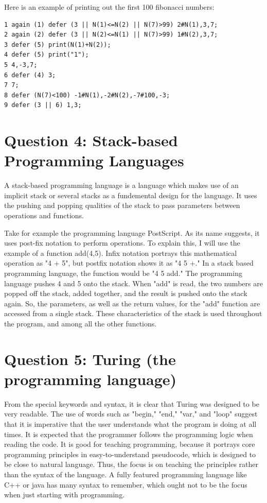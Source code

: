 \documentclass[a4paper]{article}
\begin{document}
	Here is an example of printing out the first 100 fibonacci numbers:
	\begin{lstlisting}
1 again (1) defer (3 || N(1)<=N(2) || N(7)>99) 2#N(1),3,7;
2 again (2) defer (3 || N(2)<=N(1) || N(7)>99) 1#N(2),3,7;
3 defer (5) print(N(1)+N(2));
4 defer (5) print("1");
5 4,-3,7;
6 defer (4) 3;
7 7;
8 defer (N(7)<100) -1#N(1),-2#N(2),-7#100,-3;
9 defer (3 || 6) 1,3; 
	\end{lstlisting}
\section{Question 4: Stack-based Programming Languages}
	A stack-based programming language is a language which makes use of an implicit stack or several stacks as a fundemental design for the language. It uses the pushing and popping qualities of the stack to pass parameters between operations and functions. 
	
	Take for example the programming language PostScript. As its name suggests, it uses post-fix notation to perform operations. To explain this, I will use the example of a function add(4,5). Infix notation portrays this mathematical operation as "4 + 5", but postfix notation shows it as "4 5 +." In a stack based programming language, the function would be "4 5 add." The programming language pushes 4 and 5 onto the stack. When "add" is read, the two numbers are popped off the stack, added together, and the result is pushed onto the stack again. So, the parameters, as well as the return values, for the "add" function are accessed from a single stack. These characteristics of the stack is used throughout the program, and among all the other functions.
\section{Question 5: Turing (the programming language)}
	From the special keywords and syntax, it is clear that Turing was designed to be very readable. The	use of words such as "begin," "end," "var," and "loop" suggest that it is imperative that the user understands what the program is doing at all times. It is expected that the programmer follows the programming logic when reading the code. It is good for teaching programming, because it portrays core programming principles in easy-to-understand pseudocode, which is designed to be close to natural language. Thus, the focus is on teaching the principles rather than the syntax of the language. A fully featured programming language like C++ or java has many syntax to remember, which ought not to be the focus when just starting with programming.
	
\end{document}
